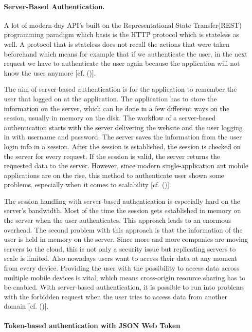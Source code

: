 \paragraph{Server-Based Authentication.}
A lot of modern-day API’s built on the Representational State Transfer(REST) programming paradigm which basis is the HTTP protocol which is stateless as well. A protocol that is stateless does not recall the actions that were taken beforehand which means for example that if we authenticate the user, in the next request we have to authenticate the user again because the application will not know the user anymore [cf. (\cite{Serilleja:2015:Scothio})]. 

The aim of server-based authentication is for the application to remember the user that logged on at the application. The application has to store the information on the server, which can be done in a few different ways on the session, usually in memory on the disk. The workflow of a server-based authentication starts with the server delivering the website and the user logging in with username and password. The server saves the information from the user login info in a session. After the session is established, the session is checked on the server for every request. If the session is valid, the server returns the requested data to the server. However, since modern single-application ant mobile applications are on the rise, this method to authenticate user shown some problems, especially when it comes to scalability [cf. (\cite{Serilleja:2015:Scothio})]. 

The session handling with server-based authentication is especially hard on the server’s bandwidth. Most of the time the session gets established in memory on the server when the user authenticates. This approach leads to an enormous overhead. The second problem with this approach is that the information of the user is held in memory on the server. Since more and more companies are moving servers to the cloud, this is not only a security issue but replicating servers to scale is limited. Also nowadays users want to access their data at any moment from every device. Providing the user with the possibility to access data across multiple mobile devices is vital, which means cross-origin resource sharing has to be enabled. With server-based authentication, it is possible to run into problems with the forbidden request when the user tries to access data from another domain [cf. (\cite{Serilleja:2015:Scothio})].


\paragraph{
	Token-based authentication with JSON Web Token
}

